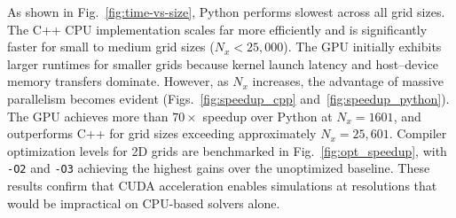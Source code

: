 \documentclass[10pt, conference]{FMFP2023}
\begin{document}
As shown in Fig.~\ref{fig:time-vs-size}, Python performs slowest
across all grid sizes.
The C++ CPU implementation scales far more efficiently and is
significantly faster for small to medium grid sizes
($N_x < 25{,}000$).
The GPU initially exhibits larger runtimes for smaller grids because
kernel launch latency and host--device memory transfers dominate.
However, as $N_x$ increases, the advantage of massive parallelism
becomes evident (Figs.~\ref{fig:speedup_cpp}
and~\ref{fig:speedup_python}).
The GPU achieves more than $70\times$ speedup over Python at
$N_x=1601$, and outperforms C++ for grid sizes exceeding approximately
$N_x=25{,}601$.
Compiler optimization levels for 2D grids are benchmarked in
Fig.~\ref{fig:opt_speedup}, with \texttt{-O2} and \texttt{-O3}
achieving the highest gains over the unoptimized baseline.
These results confirm that CUDA acceleration enables simulations at
resolutions that would be impractical on CPU-based solvers alone.

%
\end{document}
